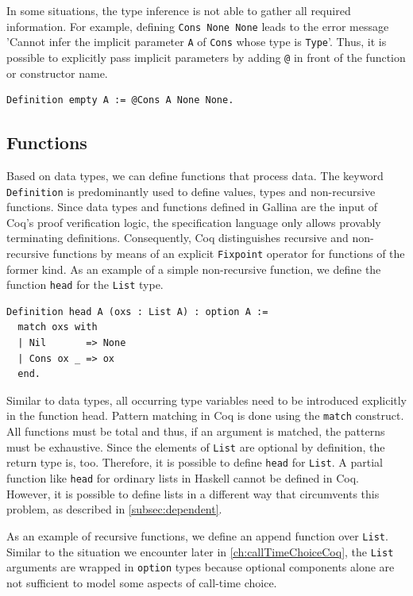 \documentclass[a4paper, 11pt, fleqn, twoside, abstract=on]{scrreprt}
\newcommand{\cinl}[1]{\texttt{#1}}
\begin{document}
In some situations, the type inference is not able to gather all required information.
For example, defining \cinl{Cons None None} leads to the error message 'Cannot infer the implicit parameter \cinl{A} of \cinl{Cons} whose type is \cinl{Type}'.
Thus, it is possible to explicitly pass implicit parameters by adding \cinl{@} in front of the function or constructor name.
\begin{verbatim}
Definition empty A := @Cons A None None.
\end{verbatim}

\subsection{Functions}
\label{subsec:coqFunctions}

Based on data types, we can define functions that process data.
The keyword \cinl{Definition} is predominantly used to define values, types and non-recursive functions.
Since data types and functions defined in Gallina are the input of Coq's proof verification logic, the specification language only allows provably terminating definitions.
Consequently, Coq distinguishes recursive and non-recursive functions by means of an explicit \cinl{Fixpoint} operator for functions of the former kind.
As an example of a simple non-recursive function, we define the function \cinl{head} for the \cinl{List} type.

\begin{verbatim}
Definition head A (oxs : List A) : option A :=
  match oxs with
  | Nil       => None
  | Cons ox _ => ox
  end.
\end{verbatim}

Similar to data types, all occurring type variables need to be introduced explicitly in the function head.
Pattern matching in Coq is done using the \cinl{match} construct.
All functions must be total and thus, if an argument is matched, the patterns must be exhaustive.
Since the elements of \cinl{List} are optional by definition, the return type is, too.
Therefore, it is possible to define \cinl{head} for \cinl{List}.
A partial function like \cinl{head} for ordinary lists in Haskell cannot be defined in Coq.
However, it is possible to define lists in a different way that circumvents this problem, as described in \autoref{subsec:dependent}.

As an example of recursive functions, we define an append function over \cinl{List}.
Similar to the situation we encounter later in \autoref{ch:callTimeChoiceCoq}, the \cinl{List} arguments are wrapped in \cinl{option} types because optional components alone are not sufficient to model some aspects of call-time choice.
\end{document}
